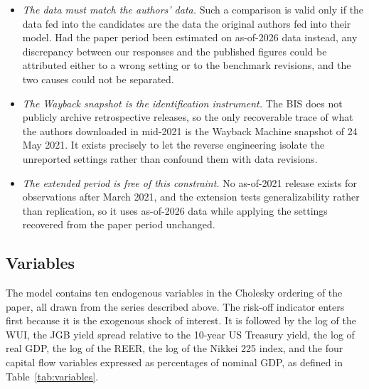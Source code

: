 \begin{itemize}
    \item \textit{The data must match the authors' data.}
\newline Such a comparison is valid only if the data fed into the candidates are the data the original authors fed into their model. Had the paper period been estimated on as-of-2026 data instead, any discrepancy between our responses and the published figures could be attributed either to a wrong setting or to the benchmark revisions, and the two causes could not be separated.
    \item \textit{The Wayback snapshot is the identification instrument.}
\newline The BIS does not publicly archive retrospective releases, so the only recoverable trace of what the authors downloaded in mid-2021 is the Wayback Machine snapshot of 24 May 2021. It exists precisely to let the reverse engineering isolate the unreported settings rather than confound them with data revisions.
    \item \textit{The extended period is free of this constraint.}
\newline No as-of-2021 release exists for observations after March 2021, and the extension tests generalizability rather than replication, so it uses as-of-2026 data while applying the settings recovered from the paper period unchanged.
\end{itemize}

\subsection{Variables}

The model contains ten endogenous variables in the Cholesky ordering of the paper, all drawn from the series described above. The risk-off indicator enters first because it is the exogenous shock of interest. It is followed by the log of the WUI, the JGB yield spread relative to the 10-year US Treasury yield, the log of real GDP, the log of the REER, the log of the Nikkei 225 index, and the four capital flow variables expressed as percentages of nominal GDP, as defined in Table~\ref{tab:variables}.

